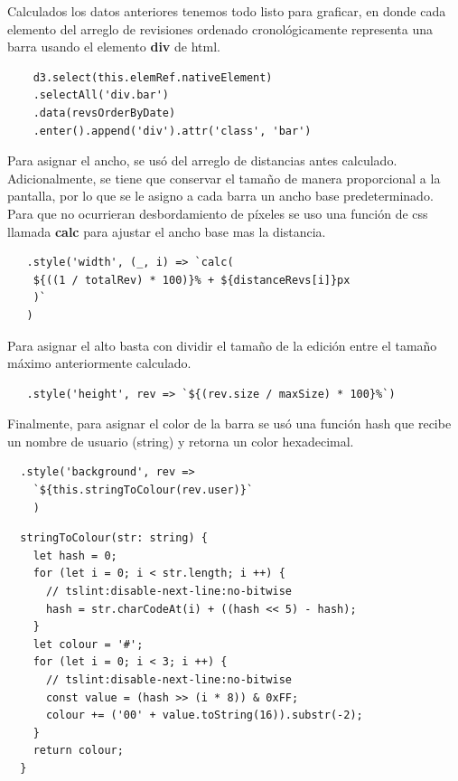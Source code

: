 \begin{enumerate}
  Calculados los datos anteriores tenemos todo listo para graficar, en donde cada elemento del arreglo de revisiones ordenado cronológicamente representa una barra usando el elemento \textbf{div} de html.
  
  \begin{verbatim}
    d3.select(this.elemRef.nativeElement)
    .selectAll('div.bar')
    .data(revsOrderByDate)
    .enter().append('div').attr('class', 'bar')
  \end{verbatim} 
  
  Para asignar el ancho, se usó del arreglo de distancias antes calculado. Adicionalmente, se tiene que conservar el tamaño de manera proporcional a la pantalla, por lo que se le asigno a cada barra un ancho base predeterminado. Para que no ocurrieran desbordamiento de píxeles se uso una función de css llamada \textbf{calc} para ajustar el ancho base mas la distancia.
  
  \begin{verbatim}
   .style('width', (_, i) => `calc(
    ${((1 / totalRev) * 100)}% + ${distanceRevs[i]}px
    )`
   )
  \end{verbatim} 
  
  Para asignar el alto basta con dividir el tamaño de la edición entre el tamaño máximo anteriormente calculado.
  
  \begin{verbatim}
   .style('height', rev => `${(rev.size / maxSize) * 100}%`)
  \end{verbatim} 
  
  Finalmente, para asignar el color de la barra se usó una función hash que recibe un nombre de usuario (string) y retorna un color hexadecimal.
 
  \begin{verbatim}
  .style('background', rev => 
    `${this.stringToColour(rev.user)}`
    )
  \end{verbatim}
  \begin{verbatim}
  stringToColour(str: string) {
    let hash = 0;
    for (let i = 0; i < str.length; i ++) {
      // tslint:disable-next-line:no-bitwise
      hash = str.charCodeAt(i) + ((hash << 5) - hash);
    }
    let colour = '#';
    for (let i = 0; i < 3; i ++) {
      // tslint:disable-next-line:no-bitwise
      const value = (hash >> (i * 8)) & 0xFF;
      colour += ('00' + value.toString(16)).substr(-2);
    }
    return colour;
  }
  \end{verbatim} 
  

\end{enumerate}
